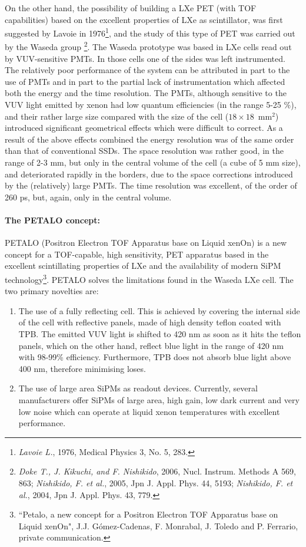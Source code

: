 On the other hand, the possibility of building a LXe PET (with TOF capabilities) based on the excellent properties of LXe as scintillator, was first suggested by Lavoie in 1976\footnote{{\em Lavoie L.}, 1976, Medical Physics 3, No. 5, 283.}, and the study of this type of PET was carried out by the Waseda group \footnote{{\em Doke T., J. Kikuchi, and F. Nishikido}, 2006, 
Nucl. Instrum. Methods A 569, 863;  {\em Nishikido, F. et al.}, 2005, Jpn J. Appl. Phys. 44, 5193; {\em Nishikido, F. et al.}, 2004, Jpn J. Appl. Phys. 43, 779.}. The Waseda prototype was based in LXe cells read out by VUV-sensitive PMTs. In those cells one of the sides was left instrumented. The relatively poor performance of the system can be attributed in part to the use of PMTs and in part to the partial lack of instrumentation which affected both the energy and the time resolution. The PMTs, although sensitive to the VUV light emitted by xenon had low quantum efficiencies (in the range 5-25 \%), and their rather large size compared with the size of the cell ($18\times 18$~mm$^2$) introduced significant geometrical effects which were difficult to correct. As a result of the above effects combined the energy resolution was of the same order than that of conventional SSDs. The space resolution was rather good, in the range of 2-3 mm, but only in the central volume of the cell (a cube of 5 mm size), and deteriorated rapidly in the borders, due to the space corrections introduced by the (relatively) large PMTs. The time resolution was excellent, of the order of 260 ps, but, again, only in the central volume. 

\paragraph{The PETALO concept:}

PETALO (Positron Electron TOF Apparatus base on Liquid xenOn) is a new concept for a TOF-capable, high sensitivity, PET apparatus based in the excellent scintillating properties of LXe and the availability of modern SiPM technology\footnote{``Petalo, a new concept for a Positron Electron TOF Apparatus base on Liquid xenOn", J.J. Gómez-Cadenas, F. Monrabal, J. Toledo and P. Ferrario, private communication. }. PETALO 
solves the limitations found in the Waseda LXe cell. The two primary novelties are:
\begin{enumerate}
\item The use of a fully reflecting cell. This is achieved by covering the internal side of the cell with reflective panels, made of high density teflon coated with TPB. The emitted VUV light is shifted to 420 nm as soon as it hits the teflon panels, which on the other hand, reflect blue light in the range of 420 nm with 98-99\% efficiency. Furthermore, TPB does not absorb blue light above 400 nm, therefore minimising loses. 
\item The use of large area SiPMs as readout devices. Currently, several manufacturers offer SiPMs of large area, high gain, low dark current and very low noise which can operate at liquid xenon temperatures with excellent performance.  
\end{enumerate} 

